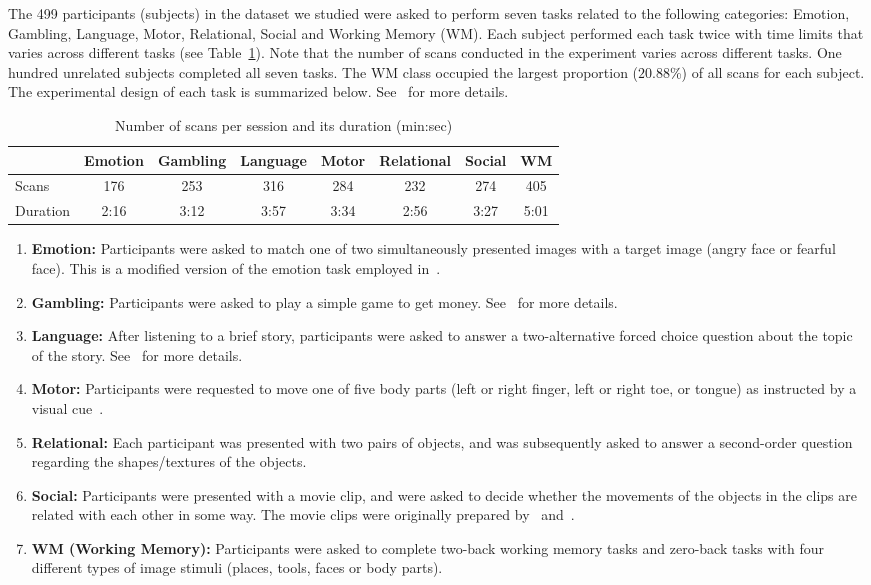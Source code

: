 The 499 participants (subjects) in the dataset we studied were asked to perform seven tasks related to the following categories: Emotion, Gambling, Language, Motor, Relational, Social and Working Memory (WM).
%
Each subject performed each task twice with time limits that varies across different tasks (see Table~\ref{tab:1}).
%
Note that the number of scans conducted in the experiment varies across different tasks.
%
One hundred unrelated subjects completed all seven tasks.
%
The WM class occupied the largest proportion ($20.88$\%) of all scans for each subject.
%
The experimental design of each task is summarized below.
%
See~\cite{barch2013function} for more details.
%
\begin{table}[htbp]
 \centering
  \caption{Number of scans per session and its duration (min:sec)}
 {\small
  \begin{tabular}{lccccccc}
   \hline
    & \textbf{Emotion} & \textbf{Gambling} & \textbf{Language} & \textbf{Motor} & \textbf{Relational} & \textbf{Social} & \textbf{WM}\\
   \hline
   Scans & 176 & 253 & 316 & 284 & 232 & 274 & 405  \\
   Duration & 2:16 & 3:12 & 3:57 & 3:34 & 2:56 & 3:27 & 5:01   \\
   \hline
  \end{tabular}
  \label{tab:1}
 }
\end{table}
%
\begin{enumerate}
 \item \textbf{Emotion:} Participants were asked to match one of two simultaneously presented images with a target image (angry face or fearful face). This is a modified version of the emotion task employed in~\cite{hariri2002amygdala}.
 \item \textbf{Gambling:} Participants were asked to play a simple game to get money. See~\cite{delgado2000tracking} for more details.
 \item \textbf{Language:} After listening to a brief story, participants were asked to answer a two-alternative forced choice question about the topic of the story. See~\cite{binder2011mapping} for more details.
 \item \textbf{Motor:} Participants were requested to move one of five body parts (left or right finger, left or right toe, or tongue) as instructed by a visual cue~\cite{buckner2011organization}.
 \item \textbf{Relational:} Each participant was presented with two pairs of objects, and was subsequently asked to answer a second-order question regarding the shapes/textures of the objects.
 \item \textbf{Social:} Participants were presented with a movie clip, and were asked to decide whether the movements of the objects in the clips are related with each other in some way. The movie clips were originally prepared by~\cite{castelli2000movement} and~\cite{wheatley2007understanding}.
 \item \textbf{WM (Working Memory):} Participants were asked to complete two-back working memory tasks and zero-back tasks with four different types of image stimuli (places, tools, faces or body parts).
\end{enumerate}

